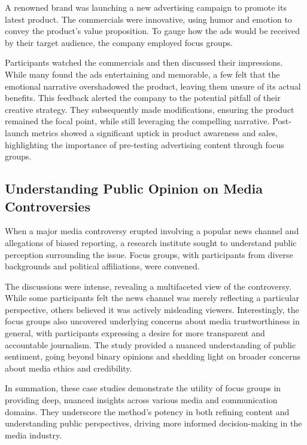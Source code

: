 \documentclass[
  b5paper]{book}
\begin{document}
A renowned brand was launching a new advertising campaign to promote its latest product. The commercials were innovative, using humor and emotion to convey the product's value proposition. To gauge how the ads would be received by their target audience, the company employed focus groups.

Participants watched the commercials and then discussed their impressions. While many found the ads entertaining and memorable, a few felt that the emotional narrative overshadowed the product, leaving them unsure of its actual benefits. This feedback alerted the company to the potential pitfall of their creative strategy. They subsequently made modifications, ensuring the product remained the focal point, while still leveraging the compelling narrative. Post-launch metrics showed a significant uptick in product awareness and sales, highlighting the importance of pre-testing advertising content through focus groups.

\hypertarget{understanding-public-opinion-on-media-controversies}{%
\subsection*{Understanding Public Opinion on Media Controversies}\label{understanding-public-opinion-on-media-controversies}}

When a major media controversy erupted involving a popular news channel and allegations of biased reporting, a research institute sought to understand public perception surrounding the issue. Focus groups, with participants from diverse backgrounds and political affiliations, were convened.

The discussions were intense, revealing a multifaceted view of the controversy. While some participants felt the news channel was merely reflecting a particular perspective, others believed it was actively misleading viewers. Interestingly, the focus groups also uncovered underlying concerns about media trustworthiness in general, with participants expressing a desire for more transparent and accountable journalism. The study provided a nuanced understanding of public sentiment, going beyond binary opinions and shedding light on broader concerns about media ethics and credibility.

In summation, these case studies demonstrate the utility of focus groups in providing deep, nuanced insights across various media and communication domains. They underscore the method's potency in both refining content and understanding public perspectives, driving more informed decision-making in the media industry.
\end{document}
